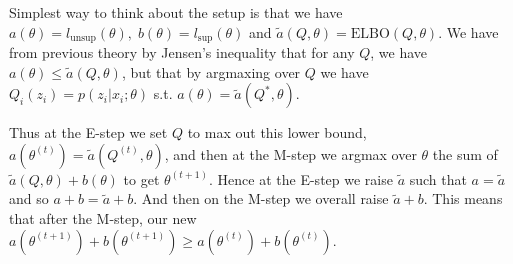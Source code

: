 %
%
\begin{answer}

Simplest way to think about the setup is that we have $a(\theta) = l_{\text{unsup}}(\theta),\; b(\theta) = l_{\text{sup}}(\theta)$ and $\tilde{a}(Q, \theta) = \text{ELBO}(Q, \theta)$. We have from previous theory by Jensen's inequality that for any $Q$, we have $a(\theta) \leq \tilde{a}(Q, \theta)$, but that by argmaxing over $Q$ we have $Q_i(z_i) = p(z_i | x_i ; \theta)$ s.t. $a(\theta) = \tilde{a}(Q^*, \theta)$.

Thus at the E-step we set $Q$ to max out this lower bound, $a(\theta^{(t)}) = \tilde{a}(Q^{(t)}, \theta)$, and then at the M-step we argmax over $\theta$ the sum of $\tilde{a}(Q, \theta) + b(\theta)$ to get $\theta^{(t+1)}$. Hence at the E-step we raise $\tilde{a}$ such that $a = \tilde{a}$ and so $a + b = \tilde{a} + b$. And then on the M-step we overall raise $\tilde{a} + b$. This means that after the M-step, our new $a(\theta^{(t+1)}) + b(\theta^{(t+1)}) \geq a(\theta^{(t)}) + b(\theta^{(t)})$.


\end{answer}
%